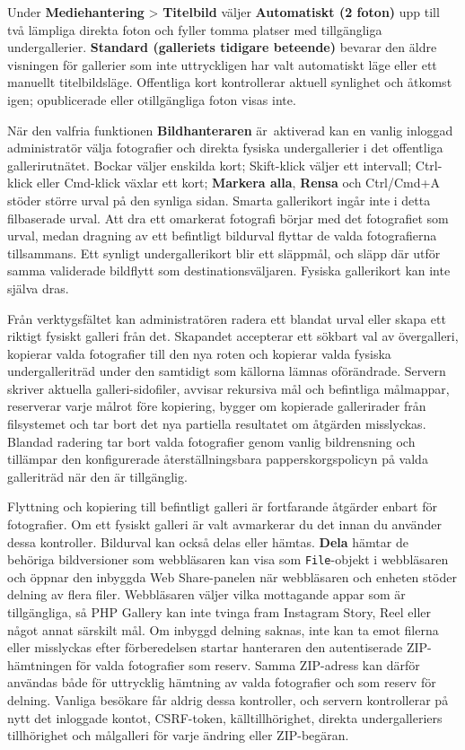 \documentclass[11pt,a4paper]{article}
\newcommand{\ui}[1]{\textbf{#1}}
\newcommand{\codeword}[1]{\nolinkurl{#1}}
\begin{document}
Under \ui{Mediehantering} > \ui{Titelbild} väljer \ui{Automatiskt (2 foton)} upp
till två lämpliga direkta foton och fyller tomma platser med tillgängliga
undergallerier. \ui{Standard (galleriets tidigare beteende)} bevarar den äldre
visningen för gallerier som inte uttryckligen har valt automatiskt läge eller
ett manuellt titelbildsläge. Offentliga kort kontrollerar aktuell synlighet och
åtkomst igen; opublicerade eller otillgängliga foton visas inte.

När den valfria funktionen \ui{Bildhanteraren} är~aktiverad kan en vanlig
inloggad administratör välja fotografier och direkta fysiska undergallerier i
det offentliga gallerirutnätet. Bockar väljer enskilda kort; Skift-klick väljer
ett intervall; Ctrl-klick eller Cmd-klick växlar ett kort; \ui{Markera alla},
\ui{Rensa} och Ctrl/Cmd+A stöder större urval på den synliga sidan. Smarta
gallerikort ingår inte i detta filbaserade urval. Att dra ett omarkerat
fotografi börjar med det fotografiet som urval, medan dragning av ett befintligt
bildurval flyttar de valda fotografierna tillsammans. Ett synligt
undergallerikort blir ett släppmål, och släpp där utför samma validerade
bildflytt som destinationsväljaren. Fysiska gallerikort kan inte själva dras.

Från verktygsfältet kan administratören radera ett blandat urval eller skapa ett
riktigt fysiskt galleri från det. Skapandet accepterar ett sökbart val av
övergalleri, kopierar valda fotografier till den nya roten och kopierar valda
fysiska undergalleriträd under den samtidigt som källorna lämnas oförändrade.
Servern skriver aktuella galleri-sidofiler, avvisar rekursiva mål och befintliga
målmappar, reserverar varje målrot före kopiering, bygger om kopierade
gallerirader från filsystemet och tar bort det nya partiella resultatet om
åtgärden misslyckas. Blandad radering tar bort valda fotografier genom vanlig
bildrensning och tillämpar den konfigurerade återställningsbara
papperskorgspolicyn på valda galleriträd när den är tillgänglig.

Flyttning och kopiering till befintligt galleri är fortfarande åtgärder enbart
för fotografier. Om ett fysiskt galleri är valt avmarkerar du det innan du
använder dessa kontroller. Bildurval kan också delas eller hämtas. \ui{Dela}
hämtar de behöriga bildversioner som webbläsaren kan visa som
\codeword{File}-objekt i webbläsaren och öppnar den inbyggda Web Share-panelen
när webbläsaren och enheten stöder delning av flera filer. Webbläsaren väljer
vilka mottagande appar som är tillgängliga, så PHP Gallery kan inte tvinga fram
Instagram Story, Reel eller något annat särskilt mål. Om inbyggd delning saknas,
inte kan ta emot filerna eller misslyckas efter förberedelsen startar hanteraren
den autentiserade ZIP-hämtningen för valda fotografier som reserv. Samma
ZIP-adress kan därför användas både för uttrycklig hämtning av valda fotografier
och som reserv för delning. Vanliga besökare får aldrig dessa kontroller, och
servern kontrollerar på nytt det inloggade kontot, CSRF-token, källtillhörighet,
direkta undergalleriers tillhörighet och målgalleri för varje ändring eller
ZIP-begäran.
\end{document}
